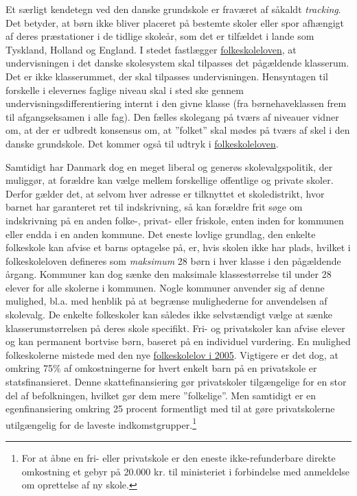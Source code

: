 \documentclass[
]{book}
\begin{document}
Et særligt kendetegn ved den danske grundskole er fraværet af såkaldt \emph{tracking}. Det betyder, at børn ikke bliver placeret på bestemte skoler eller spor afhængigt af deres præstationer i de tidlige skoleår, som det er tilfældet i lande som Tyskland, Holland og England. I stedet fastlægger \href{https://arkiv.emu.dk/sites/default/files/2019-01/Vidensnotat\%20-\%20Undervisningsdifferentiering.pdf}{folkeskoleloven}, at undervisningen i det danske skolesystem skal tilpasses det pågældende klasserum. Det er ikke klasserummet, der skal tilpasses undervisningen. Hensyntagen til forskelle i elevernes faglige niveau skal i sted ske gennem undervisningsdifferentiering internt i den givne klasse (fra børnehaveklassen frem til afgangseksamen i alle fag). Den fælles skolegang på tværs af niveauer vidner om, at der er udbredt konsensus om, at ''folket'' skal mødes på tværs af skel i den danske grundskole. Det kommer også til udtryk i \href{https://arkiv.emu.dk/sites/default/files/2019-01/Vidensnotat\%20-\%20Undervisningsdifferentiering.pdf}{folkeskoleloven}.

Samtidigt har Danmark dog en meget liberal og generøs skolevalgspolitik, der muliggør, at forældre kan vælge mellem forskellige offentlige og private skoler. Derfor gælder det, at selvom hver adresse er tilknyttet et skoledistrikt, hvor barnet har garanteret ret til indskrivning, så kan forældre frit søge om indskrivning på en anden folke-, privat- eller friskole, enten inden for kommunen eller endda i en anden kommune. Det eneste lovlige grundlag, den enkelte folkeskole kan afvise et barns optagelse på, er, hvis skolen ikke har plads, hvilket i folkeskoleloven defineres som \emph{maksimum} 28 børn i hver klasse i den pågældende årgang. Kommuner kan dog sænke den maksimale klassestørrelse til under 28 elever for alle skolerne i kommunen. Nogle kommuner anvender sig af denne mulighed, bl.a. med henblik på at begrænse mulighederne for anvendelsen af skolevalg. De enkelte folkeskoler kan således ikke selvstændigt vælge at sænke klasserumstørrelsen på deres skole specifikt. Fri- og privatskoler kan afvise elever og kan permanent bortvise børn, baseret på en individuel vurdering. En mulighed folkeskolerne mistede med den nye \hyperref[ux5cux2520https:ux2fux2fwww.retsinformation.dkux2feliux2fltaux2f2005ux2f393]{folkeskolelov i 2005}. Vigtigere er det dog, at omkring 75\% af omkostningerne for hvert enkelt barn på en privatskole er statsfinansieret. Denne skattefinansiering gør privatskoler tilgængelige for en stor del af befolkningen, hvilket gør dem mere ''folkelige''. Men samtidigt er en egenfinansiering omkring 25 procent formentligt med til at gøre privatskolerne utilgængelig for de laveste indkomstgrupper.\footnote{For at åbne en fri- eller privatskole er den eneste ikke-refunderbare direkte omkostning et gebyr på 20.000 kr. til ministeriet i forbindelse med anmeldelse om oprettelse af ny skole.}
\end{document}
